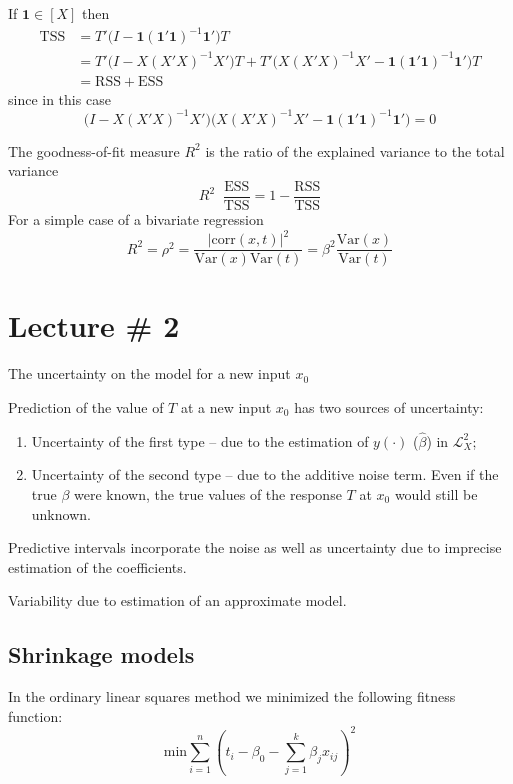 \documentclass[a4paper]{article}
\newcommand{\clo}[1]{{\left [ #1 \right ]}}
\newcommand{\brac}[1]{{\left ( #1 \right )}}
\newcommand{\abs}[1]{{\left | #1 \right |}}
\newcommand{\Lcal}{\mathcal{L}}
\newcommand{\Var}[0]{{\text{Var}}}
\newcommand{\RSS}{\text{RSS}}
\newcommand{\one}{\mathbf{1}}
\newcommand{\defn}{\mathop{\overset{\Delta}{=}}\nolimits}
\begin{document}
If $\one\in \clo{X}$ then
\begin{align*}
	\text{TSS} &= T' \bigr(I - \one(\one'\one)^{-1}\one'\bigl) T \\
	&= T' \bigl(I - X(X'X)^{-1}X'\bigr) T + T' \bigl( X(X'X)^{-1}X' - \one(\one'\one)^{-1}\one'\bigr) T \\
	&= \RSS + \text{ESS}
\end{align*}
since in this case
\[\bigl(I - X(X'X)^{-1}X'\bigr)\bigl( X(X'X)^{-1}X' - \one(\one'\one)^{-1}\one'\bigr) = 0\]

The goodness-of-fit measure $R^2$ is the ratio of the explained variance to the total variance
\[R^2 \defn \frac{\text{ESS}}{\text{TSS}} = 1 - \frac{\RSS}{\text{TSS}} \]
For a simple case of a bivariate regression
\[R^2 = \rho^2 = \frac{\abs{\text{corr}(x,t)}^2}{\Var(x)\Var(t)} = \beta^2 \frac{\Var(x)}{\Var(t)}\]




\section{Lecture \# 2} %
\label{sec:lecture_2}

The uncertainty on the model for a new input $x_0$ 

Prediction of the value of $T$ at a new input $x_0$ has two sources of uncertainty: \begin{enumerate}
	\item Uncertainty of the first type -- due to the estimation of $y(\cdot)$ ($\hat{\beta}$) in $\Lcal^2_X$;
	\item Uncertainty of the second type -- due to the additive noise term. Even if the true $\beta$ were known, the true values of the response $T$ at $x_0$ would still be unknown.
\end{enumerate}
Predictive intervals incorporate the noise as well as uncertainty due to imprecise estimation of the coefficients.

Variability due to estimation of an approximate model.

\subsection{Shrinkage models} %
\label{sub:shrinkage_models}

In the ordinary linear squares method we minimized the following fitness function:
\[\text{min} \sum_{i=1}^n \brac{t_i - \beta_0 - \sum_{j=1}^k \beta_j x_{ij}}^2\]
\end{document}

